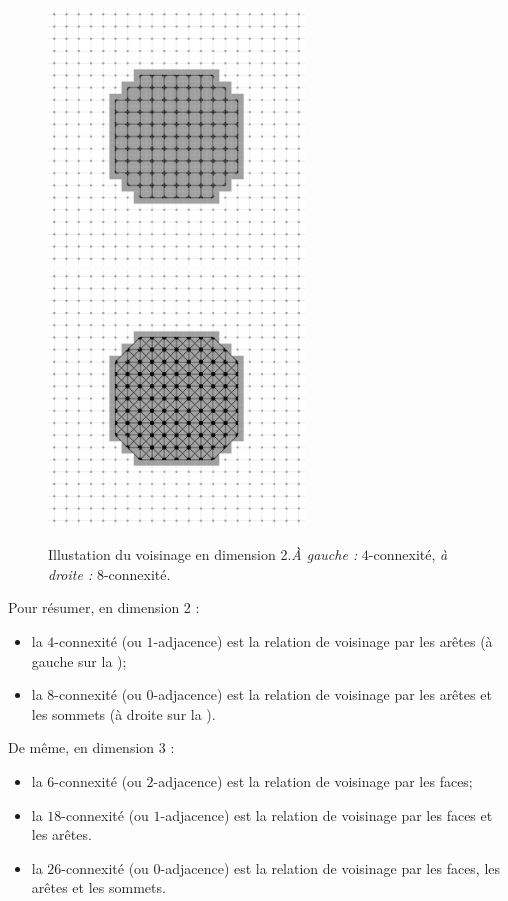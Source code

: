 \begin{figure}[ht]
  \begin{center}
    \includegraphics[width=6.8cm]{images/Notions/DiskWithAdj4}
    \includegraphics[width=6.8cm]{images/Notions/DiskWithAdj8}
    \caption{Illustation du voisinage en dimension 2.\emph{À gauche :}
    $4$-connexité, \emph{à droite :} $8$-connexité.\label{fig:adjacence2d}}
  \end{center}
\end{figure}


Pour résumer, en dimension 2 :
%
\begin{itemize}
  \item la $4$-connexité (ou $1$-adjacence) est la relation de voisinage par les
  arêtes (à gauche sur la );
  \item la $8$-connexité (ou $0$-adjacence) est la relation de voisinage par les
  arêtes et les sommets (à droite sur la ).
\end{itemize}
%
De même, en dimension 3 :
%
\begin{itemize}
  \item la $6$-connexité (ou $2$-adjacence) est la relation de voisinage par les
  faces;
  \item la $18$-connexité (ou $1$-adjacence) est la relation de voisinage par
  les faces et les arêtes.
  \item la $26$-connexité (ou $0$-adjacence) est la relation de voisinage par
  les faces, les arêtes et les sommets.
\end{itemize}


